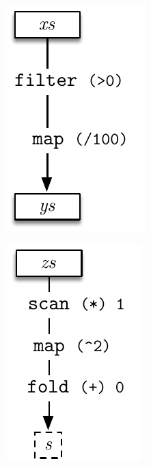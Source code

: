 \documentclass[preamble.tex]{subfiles}
\begin{document}
\begin{figure}

\begin{subfigure}{.33\textwidth}%
\includegraphics[center,scale=\omniscale]{img/DFD-simple-pipeline-a}%
\end{subfigure}%
\begin{subfigure}{.33\textwidth}%
\includegraphics[center,scale=\omniscale]{img/DFD-simple-pipeline-b}%
\end{subfigure}%
\begin{subfigure}{.33\textwidth}%

\end{subfigure}
\end{figure}
\end{document}
